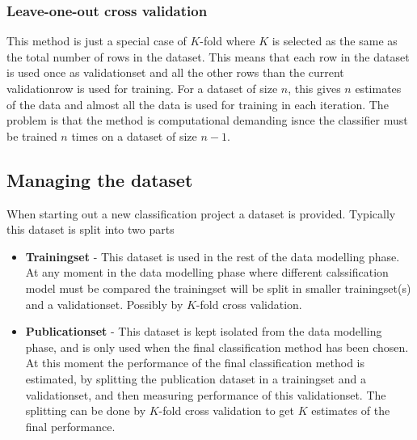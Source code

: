 \subsubsection{Leave-one-out cross validation}
This method is just a special case of $K$-fold where $K$ is selected as the same as the total number of rows in the dataset. This means that each row in the dataset is used once as validationset and all the other rows than the current validationrow is used for training. For a dataset of size $n$, this gives $n$ estimates of the data and almost all the data is used for training in each iteration. The problem is that the method is computational demanding isnce the classifier must be trained $n$ times on a dataset of size $n-1$.


\subsection{Managing the dataset}
When starting out a new classification project a dataset is provided. Typically this dataset is split into two parts
\begin{itemize}
    \item {\bfseries Trainingset} - This dataset is used in the rest of the data modelling phase. At any moment in the data modelling phase where different calssification model must be compared the trainingset will be split in smaller trainingset(s) and a validationset. Possibly by $K$-fold cross validation.
    \item {\bfseries Publicationset} - This dataset is kept isolated from the data modelling phase, and is only used when the final classification method has been chosen. At this moment the performance of the final classification method is estimated, by splitting the publication dataset in a trainingset and a validationset, and then measuring performance of this validationset. The splitting can be done by $K$-fold cross validation to get $K$ estimates of the final performance.
\end{itemize}


